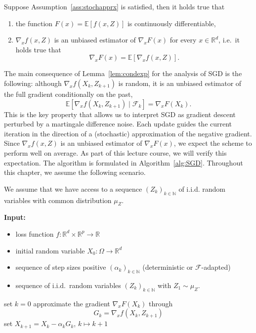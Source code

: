 \documentclass[12pt,openany]{book}
\theoremstyle{definition}
\theoremstyle{definition}
\newcommand{\E}{\mathbb{E}}
\newcommand{\N}{\mathbb{N}}
\newcommand{\R}{\mathbb{R}}
\begin{document}
\begin{lemma}\label{lem:condexp}
Suppose Assumption~\ref{ass:stochapprx} is satisfied, then it holds true that
\begin{enumerate}
\item the function $F(x) =\E[f(x,Z)]$ is continuously differentiable,
\item $\nabla_x f(x,Z)$ is an unbiased estimator of $\nabla_x F(x)$ for every $x\in\R^d$, i.e.~it holds true that \[\nabla_x F(x) = \E[\nabla_x f(x,Z)]. \]
\end{enumerate}
\end{lemma}

The main consequence of Lemma~\ref{lem:condexp} for the analysis of SGD is the following:
although $\nabla_x f(X_k,Z_{k+1})$ is random, it is an unbiased estimator of the full gradient conditionally on the past,
\[
\E[\nabla_x f(X_k,Z_{k+1})\mid \mathcal F_k] =
\nabla_x F(X_k).
\]
This is the key property that allows us to interpret SGD as gradient descent perturbed by a martingale difference noise.
Each update guides the current iteration in the direction of a (stochastic) approximation of the negative gradient. Since $\nabla_x f(x,Z)$ is an unbiased estimator of $\nabla_x F(x)$, we expect the scheme to perform well on average. As part of this lecture course, we will verify this expectation. The algorithm is formulated in Algorithm~\ref{alg:SGD}. Throughout this chapter, we assume the following scenario.
\begin{ass}\label{ass:iid_sample}
We assume that we have access to a sequence $(Z_k)_{k\in\N}$ of i.i.d. random variables with common distribution $\mu_Z$.
\end{ass}

\begin{algorithm}[htb!]
\begin{algorithmic}[1]
\State \textbf{Input:} \begin{itemize}
 \item loss function $f:\R^d\times \R^p\to\R$
 \item initial random variable $X_0:\Omega\to\R^d$
 \item sequence of step sizes positive $(\alpha_k)_{k\in\N}$ (deterministic or $\mathcal F$-adapted)
 \item sequence of i.i.d.~random variables $(Z_k)_{k\in\N}$ with $Z_1\sim\mu_Z$. 
 \end{itemize}
 \State set $k=0$
	\State approximate the gradient $\nabla_x F(X_k)$ through
	\[G_k = \nabla_x f(X_k,Z_{k+1}) \]
	\State set $X_{k+1} = X_k -\alpha_k G_k$, $k \mapsto k+1$
\EndWhile
\end{algorithmic}
 \caption{Stochastic gradient descent method (SGD)}\label{alg:SGD}
\end{algorithm}
\end{document}
